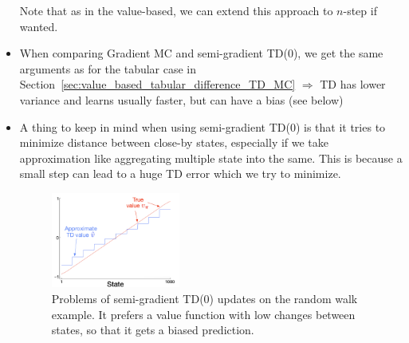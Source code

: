 \begin{itemize}
	Note that as in the value-based, we can extend this approach to $n$-step if wanted.
	\item When comparing Gradient MC and semi-gradient TD(0), we get the same arguments as for the tabular case in Section~\ref{sec:value_based_tabular_difference_TD_MC} $\Rightarrow$ TD has lower variance and learns usually faster, but can have a bias (see below)
	\item A thing to keep in mind when using semi-gradient TD(0) is that it tries to minimize distance between close-by states, especially if we take approximation like aggregating multiple state into the same. This is because a small step can lead to a huge TD error which we try to minimize. 
	\begin{figure}[ht!]
		\centering
		\includegraphics[width=0.4\textwidth]{figures/rl_approximate_value_based_semi_gradient_td.png}
		\caption{Problems of semi-gradient TD(0) updates on the random walk example. It prefers a value function with low changes between states, so that it gets a biased prediction.}
		\label{fig:rl_approximate_value_based_semi_gradient_td}
	\end{figure}
\end{itemize}
